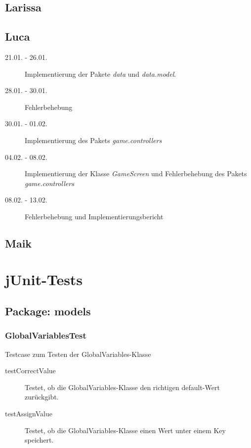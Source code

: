 \documentclass[parskip=full]{scrreprt}
\begin{document}
\section{Larissa}

\section{Luca}

\begin{description}
\item[21.01. - 26.01.]
Implementierung der Pakete \emph{data} und \emph{data.model}.
\item[28.01. - 30.01.]
Fehlerbehebung
\item[30.01. - 01.02.]
Implementierung des Pakets \emph{game.controllers}
\item[04.02. - 08.02.]
Implementierung der Klasse \emph{GameScreen} und Fehlerbehebung des Pakets \emph{game.controllers}
\item[08.02. - 13.02.]
Fehlerbehebung und Implementierungsbericht
\end{description}

\section{Maik}

\chapter{jUnit-Tests}

\section{Package: models}

\subsection{GlobalVariablesTest}

Testcase zum Testen der GlobalVariables-Klasse

\begin{description} 
\item[testCorrectValue]
	Testet, ob die GlobalVariables-Klasse den richtigen default-Wert zurückgibt.
\item[testAssignValue]
	Testet, ob die GlobalVariables-Klasse einen Wert unter einem Key speichert.
\end{description}
\end{document}
